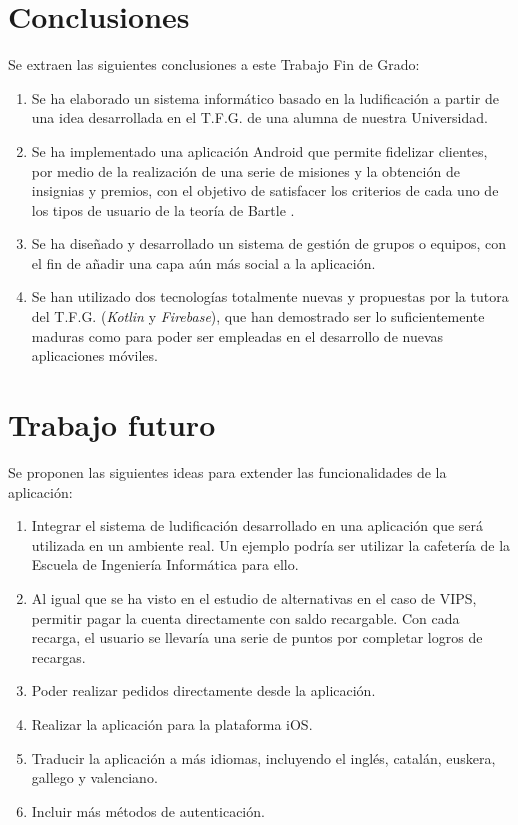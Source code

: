 \documentclass[twoside]{report}
\begin{document}
\section{Conclusiones}

Se extraen las siguientes conclusiones a este Trabajo Fin de Grado:
\begin{enumerate}

\item Se ha elaborado un sistema informático basado en la ludificación a partir de una idea desarrollada en el T.F.G. de una alumna de nuestra Universidad.

\item Se ha implementado una aplicación Android que permite fidelizar clientes, por medio de la realización de una serie de misiones y la obtención de insignias y premios, con el objetivo de satisfacer los criterios de cada uno de los tipos de usuario de la teoría de Bartle \cite{iebsctj}.

\item Se ha diseñado y desarrollado un sistema de gestión de grupos o equipos, con el fin de añadir una capa aún más social a la aplicación.

\item Se han utilizado dos tecnologías totalmente nuevas y propuestas por la tutora del T.F.G. (\textit{Kotlin} y \textit{Firebase}), que han demostrado ser lo suficientemente maduras como para poder ser empleadas en el desarrollo de nuevas aplicaciones móviles.
\end{enumerate}

\section{Trabajo futuro}

Se proponen las siguientes ideas para extender las funcionalidades de la aplicación:

\begin{enumerate}
\item Integrar el sistema de ludificación desarrollado en una aplicación que será utilizada en un ambiente real. Un ejemplo podría ser utilizar la cafetería de la Escuela de Ingeniería Informática para ello.

\item Al igual que se ha visto en el estudio de alternativas en el caso de VIPS, permitir pagar la cuenta directamente con saldo recargable. Con cada recarga, el usuario se llevaría una serie de puntos por completar logros de recargas.

\item Poder realizar pedidos directamente desde la aplicación.

\item Realizar la aplicación para la plataforma iOS.

\item Traducir la aplicación a más idiomas, incluyendo el inglés, catalán, euskera, gallego y valenciano.

\item Incluir más métodos de autenticación.
\end{enumerate}
\end{document}
